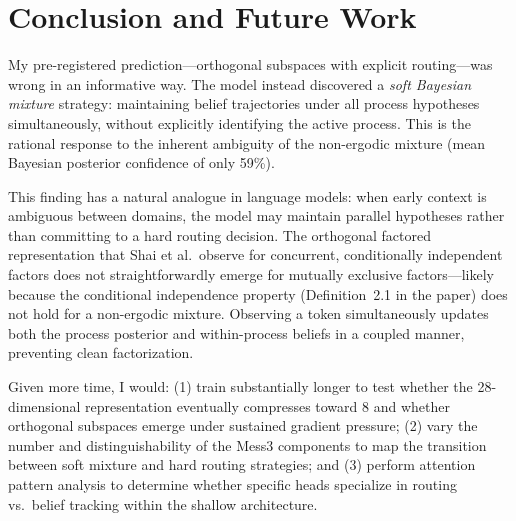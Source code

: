 \documentclass[11pt]{article}
\begin{document}
\section{Conclusion and Future Work}

My pre-registered prediction---orthogonal subspaces with explicit routing---was wrong in an informative way. The model instead discovered a \emph{soft Bayesian mixture} strategy: maintaining belief trajectories under all process hypotheses simultaneously, without explicitly identifying the active process. This is the rational response to the inherent ambiguity of the non-ergodic mixture (mean Bayesian posterior confidence of only 59\%).

This finding has a natural analogue in language models: when early context is ambiguous between domains, the model may maintain parallel hypotheses rather than committing to a hard routing decision. The orthogonal factored representation that Shai et al.\ observe for concurrent, conditionally independent factors does not straightforwardly emerge for mutually exclusive factors---likely because the conditional independence property (Definition~2.1 in the paper) does not hold for a non-ergodic mixture. Observing a token simultaneously updates both the process posterior and within-process beliefs in a coupled manner, preventing clean factorization.

Given more time, I would: (1) train substantially longer to test whether the 28-dimensional representation eventually compresses toward 8 and whether orthogonal subspaces emerge under sustained gradient pressure; (2) vary the number and distinguishability of the Mess3 components to map the transition between soft mixture and hard routing strategies; and (3) perform attention pattern analysis to determine whether specific heads specialize in routing vs.\ belief tracking within the shallow architecture.
\end{document}
